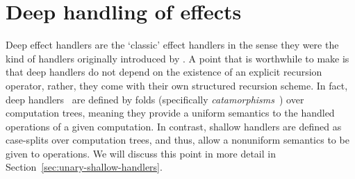 \documentclass[12pt,phd,lfcs,twoside,openright,logo,leftchapter,normalheadings]{infthesis}
\theoremstyle{plain}
\theoremstyle{definition}
\begin{document}


\section{Deep handling of effects}
\label{sec:unary-deep-handlers}
%

Deep effect handlers are the `classic' effect handlers in the sense
they were the kind of handlers originally introduced by
\citet{PlotkinP09}. A point that is worthwhile to make is that deep
handlers do not depend on the existence of an explicit recursion
operator, rather, they come with their own structured recursion
scheme. In fact, deep handlers~\cite{PlotkinP09,Pretnar10} are defined
by folds (specifically \emph{catamorphisms}~\cite{MeijerFP91}) over
computation trees, meaning they provide a uniform semantics to the
handled operations of a given computation. In contrast, shallow
handlers are defined as case-splits over computation trees, and thus,
allow a nonuniform semantics to be given to operations. We will
discuss this point in more detail in
Section~\ref{sec:unary-shallow-handlers}.
\end{document}
